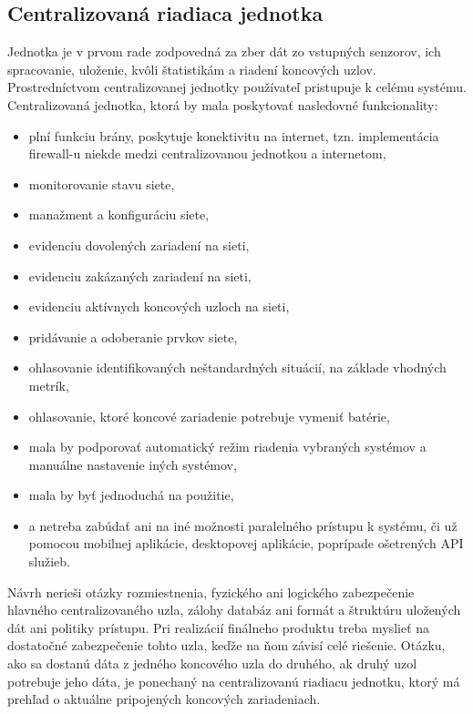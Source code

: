 \documentclass[12pt,a4paper,oneside,openright]{report}
\begin{document}
\subsection{Centralizovaná riadiaca jednotka} 
Jednotka je v prvom rade zodpovedná za zber dát zo vstupných senzorov, ich spracovanie, uloženie, kvôli štatistikám a riadení koncových uzlov. Prostredníctvom centralizovanej jednotky používateľ pristupuje k celému systému. Centralizovaná jednotka, ktorá by mala poskytovať nasledovné funkcionality:
\begin{itemize}
	\item plní funkciu brány, poskytuje konektivitu na internet, tzn. implementácia firewall-u niekde medzi centralizovanou jednotkou a internetom,
	\item monitorovanie stavu siete,
	\item manažment a konfiguráciu siete,
	\item evidenciu dovolených zariadení na sieti,
	\item evidenciu zakázaných zariadení na sieti,
	\item evidenciu aktívnych koncových uzloch na sieti,
	\item pridávanie a odoberanie prvkov siete,
	\item ohlasovanie identifikovaných neštandardných situácií, na základe vhodných metrík,
	\item ohlasovanie, ktoré koncové zariadenie potrebuje vymeniť batérie,
	\item mala by podporovať automatický režim riadenia vybraných systémov a manuálne nastavenie iných systémov,
	\item mala by byť jednoduchá na použitie,
	\item a netreba zabúdať ani na iné možnosti paralelného prístupu k systému, či už pomocou mobilnej aplikácie, desktopovej aplikácie, poprípade ošetrených API služieb.
\end{itemize}
\onehalfspacing

Návrh nerieši otázky rozmiestnenia, fyzického ani logického zabezpečenie hlavného centralizovaného uzla, zálohy databáz ani formát a štruktúru uložených dát ani politiky prístupu. Pri realizácií finálneho produktu treba myslieť na dostatočné zabezpečenie tohto uzla, keďže na ňom závisí celé riešenie.
Otázku, ako sa dostanú dáta z jedného koncového uzla do druhého, ak druhý uzol potrebuje jeho dáta, je ponechaný na centralizovanú riadiacu jednotku, ktorý má prehľad o aktuálne pripojených koncových zariadeniach.
\end{document}
